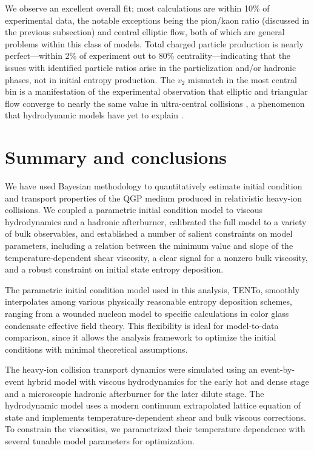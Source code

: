 \documentclass[aps,prc,reprint,amsmath,nofootinbib]{revtex4-1}
\newcommand{\trento}{T\raisebox{-0.5ex}{R}ENTo}
\begin{document}
We observe an excellent overall fit; most calculations are within 10\% of experimental data, the notable exceptions being the pion/kaon ratio (discussed in the previous subsection) and central elliptic flow, both of which are general problems within this class of models.
Total charged particle production is nearly perfect---within 2\% of experiment out to 80\% centrality---indicating that the issues with identified particle ratios arise in the particlization and/or hadronic phases, not in initial entropy production.
The $v_2$ mismatch in the most central bin is a manifestation of the experimental observation that elliptic and triangular flow converge to nearly the same value in ultra-central collisions \cite{ALICE:2011ab, CMS:2013bza}, a phenomenon that hydrodynamic models have yet to explain \cite{Denicol:2014ywa,Shen:2015qta}.


\section{Summary and conclusions}

We have used Bayesian methodology to quantitatively estimate initial condition and transport properties of the QGP medium produced in relativistic heavy-ion collisions.
We coupled a parametric initial condition model to viscous hydrodynamics and a hadronic afterburner, calibrated the full model to a variety of bulk observables, and established a number of salient constraints on model parameters, including a relation between the minimum value and slope of the temperature-dependent shear viscosity, a clear signal for a nonzero bulk viscosity, and a robust constraint on initial state entropy deposition.

The parametric initial condition model used in this analysis, \trento, smoothly interpolates among various physically reasonable entropy deposition schemes, ranging from a wounded nucleon model to specific calculations in color glass condensate effective field theory.
This flexibility is ideal for model-to-data comparison, since it allows the analysis framework to optimize the initial conditions with minimal theoretical assumptions.

The heavy-ion collision transport dynamics were simulated using an event-by-event hybrid model with viscous hydrodynamics for the early hot and dense stage and a microscopic hadronic afterburner for the later dilute stage.
The hydrodynamic model uses a modern continuum extrapolated lattice equation of state and implements temperature-dependent shear and bulk viscous corrections.
To constrain the viscosities, we parametrized their temperature dependence with several tunable model parameters for optimization.
\end{document}
